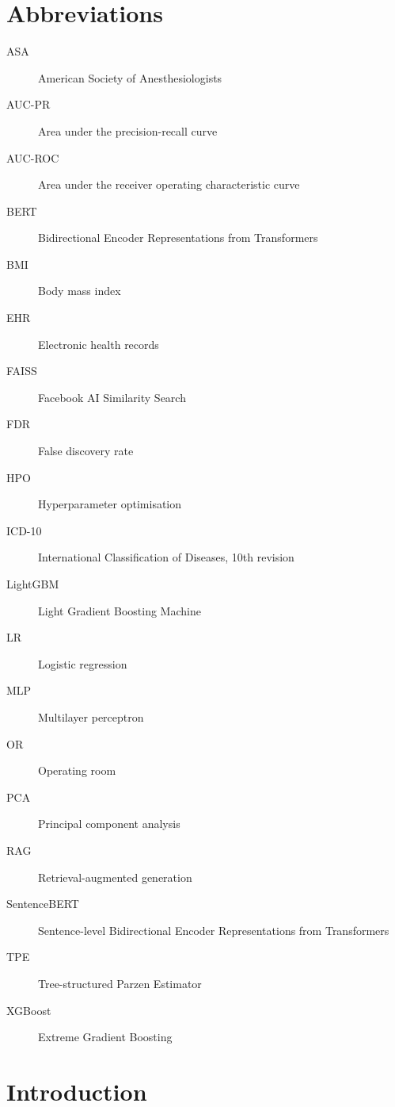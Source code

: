 \documentclass[3p, authoryear]{elsarticle}
\begin{document}
\section*{Abbreviations}
\begin{description}
    \item[ASA]          American Society of Anesthesiologists
    \item[AUC-PR]       Area under the precision-recall curve
    \item[AUC-ROC]      Area under the receiver operating characteristic curve
    \item[BERT]         Bidirectional Encoder Representations from Transformers
    \item[BMI]          Body mass index
    \item[EHR]          Electronic health records
    \item[FAISS]        Facebook AI Similarity Search
    \item[FDR]          False discovery rate
    \item[HPO]          Hyperparameter optimisation
    \item[ICD-10]       International Classification of Diseases, 10th revision
    \item[LightGBM]     Light Gradient Boosting Machine
    \item[LR]           Logistic regression
    \item[MLP]          Multilayer perceptron
    \item[OR]           Operating room
    \item[PCA]          Principal component analysis
    \item[RAG]          Retrieval-augmented generation
    \item[SentenceBERT] Sentence-level Bidirectional Encoder Representations from Transformers
    \item[TPE]          Tree-structured Parzen Estimator
    \item[XGBoost]      Extreme Gradient Boosting
\end{description}

\section{Introduction}\label{sec:introduction}


\end{document}
